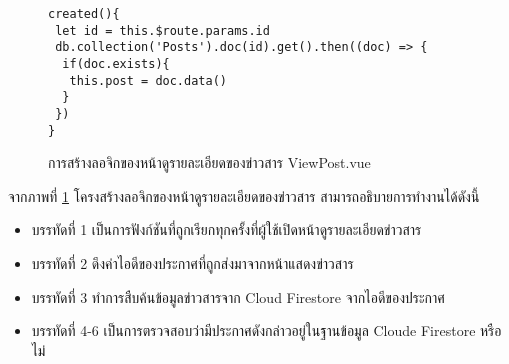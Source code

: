 			\begin{figure}[H]
				{\begin{lstlisting}
created(){
 let id = this.$route.params.id
 db.collection('Posts').doc(id).get().then((doc) => {
  if(doc.exists){
   this.post = doc.data()
  }
 })
}
					\end{lstlisting}}
				\caption{การสร้างลอจิกของหน้าดูรายละเอียดของข่าวสาร ViewPost.vue}
				\label{Fig:HomeJs}
			\end{figure}
			จากภาพที่ \ref{Fig:HomeJs} โครงสร้างลอจิกของหน้าดูรายละเอียดของข่าวสาร สามารถอธิบายการทำงานได้ดังนี้
			\begin{itemize}[label={--}]
				\item บรรทัดที่ 1  เป็นการฟังก์ชันที่ถูกเรียกทุกครั้งที่ผู้ใช้เปิดหน้าดูรายละเอียดข่าวสาร
				\item บรรทัดที่ 2 ดึงค่าไอดีของประกาศที่ถูกส่งมาจากหน้าแสดงข่าวสาร
				\item บรรทัดที่ 3 ทำการสืบค้นข้อมูลข่าวสารจาก Cloud Firestore จากไอดีของประกาศ
				\item บรรทัดที่ 4-6 เป็นการตรวจสอบว่ามีประกาศดังกล่าวอยู่ในฐานข้อมูล Cloude Firestore หรือไม่
			\end{itemize}
			
